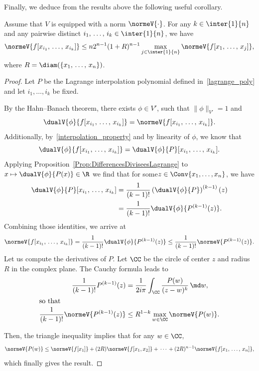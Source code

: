 Finally, we deduce from the results above the following useful corollary.
\begin{coro}\label{Coro:esti_diff_divisees_quelconques}
Assume that $V$ is equipped with a norm $\normeV{\cdot}$. For any $k\in \inter{1}{n}$ and any pairwise distinct $i_1,\,\dotsc,\,i_k\in \inter{1}{n}$, we have
\[
\normeV{f[x_{i_1},\,\dotsc,\,x_{i_k}]} \leq n 2^{n-1} (1+R)^{n-1} \max\limits_{j\in \inter{1}{n}} \normeV{f[x_1,\,\dotsc,\,x_j]},
\]
where $R=\diam(\{x_1,\,\dotsc,\,x_n\})$.
\end{coro}

\begin{proof}
Let $P$ be the Lagrange interpolation polynomial defined in~\eqref{lagrange_poly} and let $i_1,\dotsc,i_k$ be fixed.

By the Hahn--Banach theorem, there exists $\phi\in V'$, such that $\| \phi \|_{V'}=1$ and
\[
\dualV{\phi}{f[x_{i_1},\,\dotsc,\,x_{i_k}]} = \normeV{f[x_{i_1},\,\dotsc,\,x_{i_k}]}.
\]
Additionally, by~\eqref{interpolation_property} and by linearity of $\phi$, we know that
\[
\dualV{\phi}{f[x_{i_1},\,\dotsc,\,x_{i_k}]} = \dualV{\phi}{P} [x_{i_1},\,\dotsc,\,x_{i_k}].
\]
Applying Proposition~\ref{Prop:DifferencesDiviseesLagrange} to $x\mapsto \dualV{\phi}{P(x)} \in \R$ we find that for some\linebreak$z\in \Conv \{ x_1, \dots, x_n \}$, we have
\begin{align*}
\dualV{\phi}{P} [x_{i_1},\,\dotsc,\,x_{i_k}] &= \frac{1}{(k-1)!} \left(\dualV{\phi}{P}\right)^{(k-1)}(z)
\\
&= \frac{1}{(k-1)!} \dualV{\phi}{P^{(k-1)}(z)}.
\end{align*}
Combining those identities, we arrive at
\[
\normeV{f[x_{i_1},\,\dotsc,\,x_{i_k}]} = \frac{1}{(k-1)!} \dualV{\phi}{P^{(k-1)}(z)} \leq \frac{1}{(k-1)!} \normeV{P^{(k-1)}(z)}.
\]
Let us compute the derivatives of $P$. Let $\CC$ be the circle of center $z$ and radius $R$ in the complex plane. The Cauchy formula leads to
\begin{align*}
\frac{1}{(k-1)!} P^{(k-1)}(z) &= \frac{1}{2i\pi} \int_\CC \frac{P(w)}{(z-w)^k} \, \md w,
\\
\intertext{so that}
\frac{1}{(k-1)!} \normeV{P^{(k-1)}(z)} &\leq R^{1-k} \max_{w\in \CC} \normeV{P(w)}.
\end{align*}

Then, the triangle inequality implies that for any $w \in \CC$,
\[
\normeV{P(w)} \leq \normeV{f[x_1]} + (2R) \normeV{f[x_1,x_2]} +\,\cdots\,+ (2R)^{n-1} \normeV{f[x_1,\,\dotsc,\,x_n]},
\]
which finally gives the result.
\end{proof}



